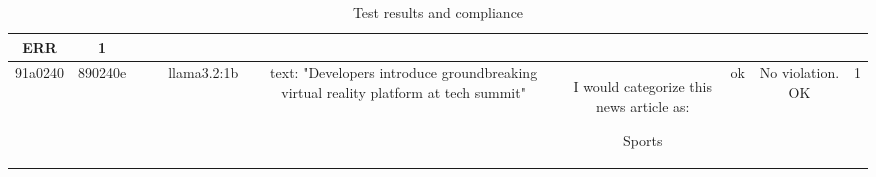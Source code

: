 \begin{table}[h!]
\begin{tabular}{|c|c|c|c|c|c|c|c|c|c|}
ERR & 1\\
\hline
91a0240 & 890240e &  &  & llama3.2:1b & text: "Developers introduce groundbreaking virtual reality platform at tech summit" & I would categorize this news article as:

Sports & ok & No violation.
OK & 1
  \end{tabular}
  \caption{Test results and compliance}
  
  \end{table}
  